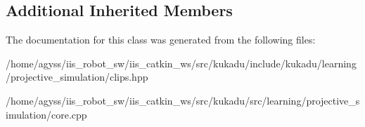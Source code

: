 \subsection*{Additional Inherited Members}


The documentation for this class was generated from the following files\+:\begin{DoxyCompactItemize}
\item 
/home/agyss/iis\+\_\+robot\+\_\+sw/iis\+\_\+catkin\+\_\+ws/src/kukadu/include/kukadu/learning/projective\+\_\+simulation/clips.\+hpp\item 
/home/agyss/iis\+\_\+robot\+\_\+sw/iis\+\_\+catkin\+\_\+ws/src/kukadu/src/learning/projective\+\_\+simulation/core.\+cpp\end{DoxyCompactItemize}
